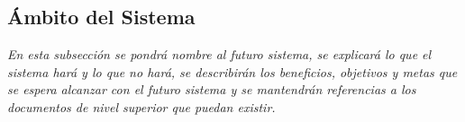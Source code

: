 \newpage

\subsection{Ámbito del Sistema}
\par \emph{En  esta  subsección  se  pondrá  nombre  al  futuro  sistema,  se  explicará  lo  que  el sistema  hará  y  lo  que  no  hará,  se  describirán  los  beneficios,  objetivos  y  metas  que  se  espera  alcanzar  con  el futuro  sistema  y  se  mantendrán  referencias  a  los  documentos  de  nivel superior que puedan existir.}

